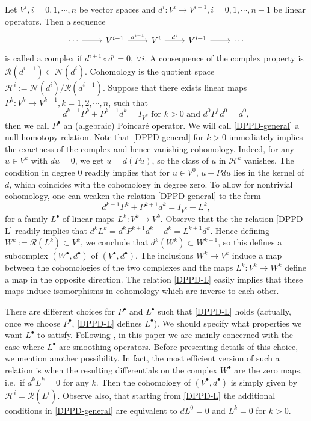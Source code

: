 \documentclass[11pt]{amsart}
\newcommand{\0}{\mathaccent23}
\renewcommand\ker{\mathcal{N}}
\newcommand\ran{\mathcal{R}}
\newcommand{\bs}{{\scriptscriptstyle \bullet}}
\begin{document}
Let $V^{i}, i=0, 1, \cdots, n$ be  vector spaces and $d^{i}: V^{i}\to V^{i+1}, i=0, 1, \cdots, n-1$ be linear operators. Then a sequence 
\begin{equation*}
\begin{tikzcd}
\cdots\arrow{r}{}&V^{i-1}\arrow{r}{d^{i-1}} &V^{i} \arrow{r}{d^{i}}&V^{i+1}\arrow{r}{ }&\cdots
 \end{tikzcd}
\end{equation*}
is called a complex if $d^{i+1}\circ d^{i}=0,~ \forall i$. A consequence of the complex property is $\ran(d^{i-1})\subset \ker(d^{i})$. Cohomology is the quotient space $\mathscr{H}^{i}:=\ker(d^{i})/\ran(d^{i-1})$. Suppose that there exists linear maps $P^{k}: V^{k}\to V^{k-1}, k=1, 2, \cdots, n$, such that 
\begin{equation}\label{DPPD-general}
d^{k-1}P^{k}+P^{k+1}d^{k}=I_{V^{k}}  \text{\ for\ } k>0 \text{\ and\ } d^0P^1d^0=d^0,  
\end{equation}
then we call $P^{\bs}$ an (algebraic) Poincar\'e operator. We will call \eqref{DPPD-general} a null-homotopy relation. Note that \eqref{DPPD-general} for $k>0$ immediately implies the exactness of the complex and hence vanishing cohomology. Indeed, for any $u\in V^{k}$ with $du=0$, we get $u=d(Pu)$, so the class of $u$ in $\mathscr{H}^k$ vanishes. The condition in degree $0$ readily implies that for $u\in V^0$, $u-Pdu$ lies in the kernel of $d$, which coincides with the cohomology in degree zero. To allow for nontrivial cohomology, one can weaken the relation \eqref{DPPD-general} to the form
\begin{equation}\label{DPPD-L}
d^{k-1}P^{k}+P^{k+1}d^{k}=I_{V^{k}}-L^{k}, 
\end{equation}
for a family $L^\bs$ of linear maps $L^k:V^k\to V^k$. Observe that the the relation \eqref{DPPD-L} readily implies that $d^kL^k=d^kP^{k+1}d^k-d^k=L^{k+1}d^k$. Hence defining $W^k:=\ran(L^k)\subset V^k$, we conclude that $d^k(W^k)\subset W^{k+1}$, so this defines a subcomplex $(W^\bs, d^\bs)$ of $(V^\bs,d^\bs)$. The inclusions $W^k\to V^k$ induce a map between the cohomologies of the two complexes and the maps $L^k:V^k\to W^k$ define a map in the opposite direction. The relation \eqref{DPPD-L} easily implies that these maps induce isomorphisms in cohomology which are inverse to each other. 

There are different choices for $P^{\bs}$ and $L^{\bs}$ such that \eqref{DPPD-L} holds (actually, once we choose $P^{\bs}$, \eqref{DPPD-L} defines $L^{\bs}$). We should specify what properties we want $L^{\bs}$ to satisfy. Following \cite{costabel2010bogovskiui}, in this paper we are mainly concerned with the case where $L^{\bs}$ are smoothing operators. Before presenting details of this choice, we mention another possibility. In fact, the most efficient version of such a relation is when the resulting differentials on the complex $W^\bs$ are the zero maps, i.e.~if $d^kL^k=0$ for any $k$. Then the cohomology of $(V^\bs,d^\bs)$ is simply given by $\mathscr{H}^{i}=\ran(L^i)$.  Observe also, that starting from \eqref{DPPD-L} the additional conditions in \eqref{DPPD-general} are equivalent to $dL^0=0$ and $L^k=0$ for $k>0$. 
\end{document}
